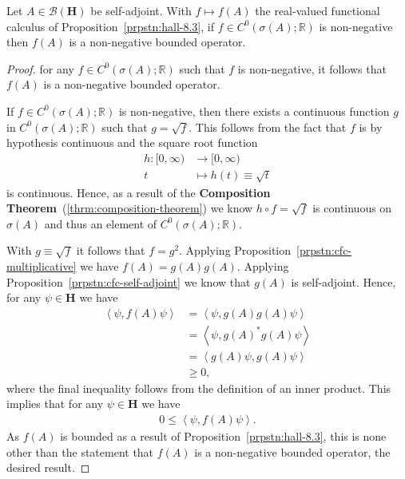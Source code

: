 \begin{proposition}
    \label{prpstn:cfc-non-negative}
    \leanok
    Let $A \in \mathcal{B}(\mathbf{H})$ be self-adjoint. With $f \mapsto f(A)$ the real-valued functional calculus of Proposition~\ref{prpstn:hall-8.3}, if $f \in C^0(\sigma(A); \mathbb{R})$ is non-negative then $f(A)$ is a non-negative bounded operator.
\end{proposition}
\begin{proof}
    \leanok
for any $f \in C^0(\sigma(A); \mathbb{R})$ such that $f$ is non-negative, it follows that $f(A)$ is a non-negative bounded operator.

If $f \in C^0(\sigma(A); \mathbb{R})$ is non-negative, then there exists a continuous function $g$ in $C^0(\sigma(A); \mathbb{R})$ such that $g = \sqrt{f}$. This follows from the fact that $f$ is by hypothesis continuous and the square root function
\begin{align}
    h : [0, \infty) &\longrightarrow [0, \infty) \\ 
             t      &\longmapsto h(t) \equiv \sqrt{t}
\end{align}
is continuous. Hence, as a result of the \textbf{Composition Theorem}~(\ref{thrm:composition-theorem}) we know $h \circ f = \sqrt{f}$ is continuous on $\sigma(A)$ and thus an element of $C^0(\sigma(A); \mathbb{R})$.

With $g \equiv \sqrt{f}$ it follows that $f = g^2$. Applying Proposition~\ref{prpstn:cfc-multiplicative} we have $f(A) = g(A)g(A)$. Applying Proposition~\ref{prpstn:cfc-self-adjoint} we know that $g(A)$ is self-adjoint. Hence, for any $\psi \in \mathbf{H}$ we have
\begin{align}
    \left< \psi, f(A)\psi \right> &= \left< \psi, g(A)g(A)\psi \right> \\
                                  &= \left< \psi, g(A)^*g(A)\psi \right> \\
                                  &= \left< g(A)\psi, g(A)\psi \right> \\
                                  &\ge 0,
\end{align}
where the final inequality follows from the definition of an inner product. This implies that for any $\psi \in \mathbf{H}$ we have
\begin{align}
    0 \le \left< \psi, f(A)\psi \right>.
\end{align}
As $f(A)$ is bounded as a result of Proposition~\ref{prpstn:hall-8.3}, this is none other than the statement that $f(A)$ is a non-negative bounded operator, the desired result.
\end{proof}

